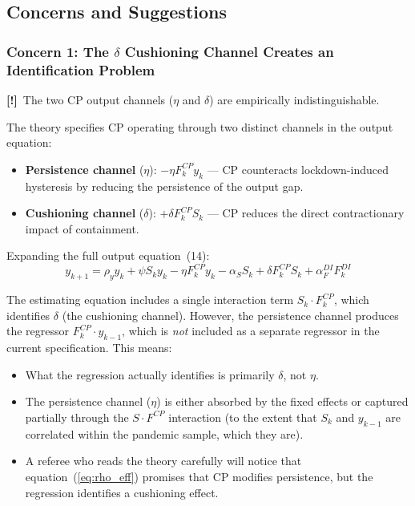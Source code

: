 \documentclass[12pt, a4paper]{article}
\newcommand{\concern}[1]{\textcolor{concern}{\textbf{[!]}~#1}}
\begin{document}
\subsection{Concerns and Suggestions}

\subsubsection*{Concern 1: The $\delta$ Cushioning Channel Creates an Identification Problem}

\concern{The two CP output channels ($\eta$ and $\delta$) are empirically indistinguishable.}

The theory specifies CP operating through two distinct channels in the output equation:
\begin{itemize}
    \item \textbf{Persistence channel} ($\eta$): $-\eta F_k^{CP} y_k$ --- CP counteracts lockdown-induced hysteresis by reducing the persistence of the output gap.
    \item \textbf{Cushioning channel} ($\delta$): $+\delta F_k^{CP} S_k$ --- CP reduces the direct contractionary impact of containment.
\end{itemize}

Expanding the full output equation~(14):
\begin{equation*}
    y_{k+1} = \rho_y y_k + \psi S_k y_k - \eta F_k^{CP} y_k - \alpha_S S_k + \delta F_k^{CP} S_k + \alpha_F^{DI} F_k^{DI}
\end{equation*}

The estimating equation includes a single interaction term $S_k \cdot F_k^{CP}$, which identifies $\delta$ (the cushioning channel). However, the persistence channel produces the regressor $F_k^{CP} \cdot y_{k-1}$, which is \textit{not} included as a separate regressor in the current specification. This means:
\begin{itemize}
    \item What the regression actually identifies is primarily $\delta$, not $\eta$.
    \item The persistence channel ($\eta$) is either absorbed by the fixed effects or captured partially through the $S \cdot F^{CP}$ interaction (to the extent that $S_k$ and $y_{k-1}$ are correlated within the pandemic sample, which they are).
    \item A referee who reads the theory carefully will notice that equation~(\ref{eq:rho_eff}) promises that CP modifies persistence, but the regression identifies a cushioning effect.
\end{itemize}
\end{document}

